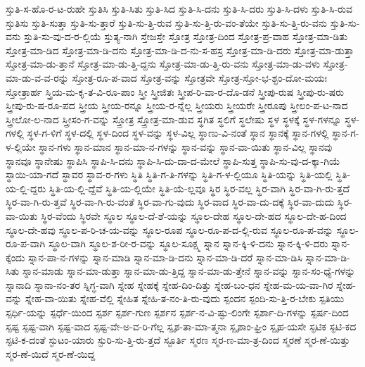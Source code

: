 {ಸ್ತುತಿ-ಸ-ಹೊ-ರ-ಟ-ರುಹೇ
ಸ್ತುತಿಸಿ
ಸ್ತುತಿ-ಸಿತು
ಸ್ತುತಿ-ಸಿದ
ಸ್ತುತಿ-ಸಿ-ದನು
ಸ್ತುತಿ-ಸಿ-ದರು
ಸ್ತುತಿ-ಸಿ-ದಳು
ಸ್ತುತಿ-ಸಿ-ರುವ
ಸ್ತುತಿಸು
ಸ್ತುತಿ-ಸುತ್ತಾ
ಸ್ತುತಿ-ಸು-ತ್ತಾರೆ
ಸ್ತುತಿ-ಸು-ತ್ತಿ-ರುವ
ಸ್ತುತಿ-ಸು-ತ್ತಿ-ರು-ವಂ-ತೆಯೇ
ಸ್ತುತಿ-ಸು-ತ್ತಿ-ರು-ವನು
ಸ್ತುತಿ-ಸು-ವನು
ಸ್ತುತಿ-ಸು-ವು-ದ-ರ-ಲ್ಲಿಯೆ
ಸ್ತುತ್ಯ-ನಾಗಿ
ಸ್ತೇಜಸ್ತೇ
ಸ್ತೋತ್ರ
ಸ್ತೋತ್ರ-ದಿಂದ
ಸ್ತೋತ್ರ-ಪ್ರ-ವಾಹ
ಸ್ತೋತ್ರ-ಮಾ-ಡಿತು
ಸ್ತೋತ್ರ-ಮಾ-ಡಿದ
ಸ್ತೋತ್ರ-ಮಾ-ಡಿ-ದನು
ಸ್ತೋತ್ರ-ಮಾ-ಡಿ-ದ-ನು-ಸ-ಹಸ್ರ
ಸ್ತೋತ್ರ-ಮಾ-ಡಿ-ದರು
ಸ್ತೋತ್ರ-ಮಾ-ಡುತ್ತಾ
ಸ್ತೋತ್ರ-ಮಾ-ಡು-ತ್ತಾನೆ
ಸ್ತೋತ್ರ-ಮಾ-ಡು-ತ್ತಿ-ದ್ದನು
ಸ್ತೋತ್ರ-ಮಾ-ಡು-ತ್ತಿ-ರು-ವನು
ಸ್ತೋತ್ರ-ಮಾ-ಡು-ವಳು
ಸ್ತೋತ್ರ-ಮಾ-ಡು-ವ-ವ-ರನ್ನು
ಸ್ತೋತ್ರ-ರೂ-ಪ-ವಾದ
ಸ್ತೋತ್ರ-ವನ್ನು
ಸ್ತೋತ್ರವೇ
ಸ್ತೋತ್ರ-ಸ್ತೋ-ಭ-ಶ್ಛಂ-ದೋ-ಮಯಃ
ಸ್ತೋತ್ರಾರ್ಹ
ಸ್ತ್ರಿಯ-ಮ-ಕೃ-ತ-ವಿ-ರೂ-ಪಾಂ
ಸ್ತ್ರೀ
ಸ್ತ್ರೀಜಿತಃ
ಸ್ತ್ರೀಪ-ರಿ-ವಾ-ರ-ದೊ-ಡನೆ
ಸ್ತ್ರೀಪು-ರುಷ
ಸ್ತ್ರೀಪು-ರು-ಷರು
ಸ್ತ್ರೀಪು-ರು-ಷ-ರೂ-ಪದ
ಸ್ತ್ರೀಯ
ಸ್ತ್ರೀಯ-ರನ್ನೂ
ಸ್ತ್ರೀಯ-ರ-ನ್ನೆಲ್ಲ
ಸ್ತ್ರೀಯರು
ಸ್ತ್ರೀಯರೇ
ಸ್ತ್ರೀರೂಪು
ಸ್ತ್ರೀಲಂ-ಪ-ಟ-ನಾದ
ಸ್ತ್ರೀಲೋ-ಲ-ನಾದ
ಸ್ತ್ರೀಸಂ-ಗ-ವನ್ನು
ಸ್ತ್ರೋತ್ರ
ಸ್ತ್ರೋತ್ರ-ಮಾ-ಡುವ
ಸ್ಥಗಿತ
ಸ್ಥಲಿಗೆ
ಸ್ಥಲೇಷು
ಸ್ಥಳ
ಸ್ಥಳಕ್ಕೆ
ಸ್ಥಳ-ಗಳನ್ನೂ
ಸ್ಥಳ-ಗಳಲ್ಲಿ
ಸ್ಥಳ-ಗ-ಳಿಗೆ
ಸ್ಥಳ-ದಲ್ಲಿ
ಸ್ಥಳ-ದಿಂದ
ಸ್ಥಳ-ವನ್ನು
ಸ್ಥಳ-ವಿಲ್ಲ
ಸ್ಥಾಣು-ವಿ-ನಂತೆ
ಸ್ಥಾನ
ಸ್ಥಾನಕ್ಕೆ
ಸ್ಥಾನ-ಗಳಲ್ಲಿ
ಸ್ಥಾನ-ಗ-ಳ-ಲ್ಲಿಯೇ
ಸ್ಥಾನ-ಗಳು
ಸ್ಥಾನ-ಮಾನ
ಸ್ಥಾನ-ಮಾ-ನ-ಗಳನ್ನು
ಸ್ಥಾನ-ವನ್ನು
ಸ್ಥಾನ-ವಾ-ಯಿತು
ಸ್ಥಾನ-ವಿಲ್ಲ
ಸ್ಥಾನವು
ಸ್ಥಾನವೂ
ಸ್ಥಾನೇಷು
ಸ್ಥಾಪಿಸಿ
ಸ್ಥಾಪಿ-ಸಿ-ದನು
ಸ್ಥಾಪಿ-ಸಿ-ದು-ದಾ-ದ-ಮೇಲೆ
ಸ್ಥಾಪಿ-ಸುತ್ತ
ಸ್ಥಾಪಿ-ಸು-ವು-ದ-ಕ್ಕಾ-ಗಿಯೆ
ಸ್ಥಾಯಿ-ಯಾ-ಗದೆ
ಸ್ಥಾವರ
ಸ್ಥಾವ-ರ-ಗಳು
ಸ್ಥಿತಿ
ಸ್ಥಿತಿ-ಗ-ತಿ-ಗಳನ್ನು
ಸ್ಥಿತಿ-ಗ-ಳ-ಲ್ಲಿಯೂ
ಸ್ಥಿತಿ-ಯನ್ನು
ಸ್ಥಿತಿ-ಯಲ್ಲಿ
ಸ್ಥಿತಿ-ಯ-ಲ್ಲಿ-ದ್ದರು
ಸ್ಥಿತಿ-ಯ-ಲ್ಲಿ-ದ್ದೆವೆ
ಸ್ಥಿತಿ-ಯ-ಲ್ಲಿಯೇ
ಸ್ಥಿತಿ-ಯೆ-ಲ್ಲವೂ
ಸ್ಥಿರ
ಸ್ಥಿರ-ವಲ್ಲ
ಸ್ಥಿರ-ವಾಗಿ
ಸ್ಥಿರ-ವಾ-ಗಿ-ರು-ತ್ತದೆ
ಸ್ಥಿರ-ವಾ-ಗಿ-ರು-ತ್ತವೆ
ಸ್ಥಿರ-ವಾ-ಗಿ-ರು-ವಂತೆ
ಸ್ಥಿರ-ವಾ-ಗು-ವುದು
ಸ್ಥಿರ-ವಾದ
ಸ್ಥಿರ-ವಾ-ದು-ದಕ್ಕೆ
ಸ್ಥಿರ-ವಾ-ದುದು
ಸ್ಥಿರ-ವಾ-ಯಿತು
ಸ್ಥಿರ-ವೆಂದು
ಸ್ಥಿರವೇ
ಸ್ಥೂಲ
ಸ್ಥೂಲ-ದೆ-ಶೆ-ಯನ್ನು
ಸ್ಥೂಲ-ದೇಹ
ಸ್ಥೂಲ-ದೇ-ಹದ
ಸ್ಥೂಲ-ದೇ-ಹ-ದಿಂದ
ಸ್ಥೂಲ-ದೇ-ಹವು
ಸ್ಥೂಲ-ಪ-ರಿ-ಚ-ಯ-ವನ್ನು
ಸ್ಥೂಲ-ರೂಪ
ಸ್ಥೂಲ-ರೂ-ಪ-ದ-ಲ್ಲಿ-ರುವ
ಸ್ಥೂಲ-ರೂ-ಪ-ವನ್ನು
ಸ್ಥೂಲ-ರೂ-ಪ-ವಾಗಿ
ಸ್ಥೂಲ-ವಾಗಿ
ಸ್ಥೂಲ-ಶ-ರೀ-ರ-ವನ್ನು
ಸ್ಥೂಲ-ಸೂಕ್ಷ್ಮ
ಸ್ನಾನ
ಸ್ನಾನ-ಕ್ಕಿ-ಳಿ-ದನು
ಸ್ನಾನ-ಕ್ಕಿ-ಳಿ-ದರು
ಸ್ನಾನ-ಕ್ಕೆಂದು
ಸ್ನಾನ-ಪಾ-ನ-ಗಳನ್ನು
ಸ್ನಾನ-ಮಾಡಿ
ಸ್ನಾನ-ಮಾ-ಡಿ-ದನು
ಸ್ನಾನ-ಮಾ-ಡಿ-ದರೆ
ಸ್ನಾನ-ಮಾ-ಡಿಸಿ
ಸ್ನಾನ-ಮಾ-ಡಿ-ಸಿತು
ಸ್ನಾನ-ಮಾಡು
ಸ್ನಾನ-ಮಾ-ಡುತ್ತಾ
ಸ್ನಾನ-ಮಾ-ಡು-ತ್ತಿದ್ದ
ಸ್ನಾನ-ಮಾ-ಡು-ತ್ತೇನೆ
ಸ್ನಾನ-ವನ್ನು
ಸ್ನಾನ-ಸಂ-ಧ್ಯೆ-ಗಳನ್ನು
ಸ್ನಾನಾದಿ
ಸ್ನಾನಾ-ನಂ-ತರ
ಸ್ನಿಗ್ಧ-ವಾಗಿ
ಸ್ನೇಹ
ಸ್ನೇಹಕ್ಕೆ
ಸ್ನೇಹ-ದಿಂ-ದಿತ್ತು
ಸ್ನೇಹ-ಬಂ-ಧನ
ಸ್ನೇಹ-ಮ-ಯ-ವಾ-ಗಿರ
ಸ್ನೇಹ-ವನ್ನು
ಸ್ನೇಹ-ವಾ-ಯಿತು
ಸ್ನೇಹ-ವೆಲ್ಲಿ
ಸ್ನೇಹಿತ
ಸ್ನೇಹಿ-ತ-ನಂ-ತಿ-ರು-ವುದು
ಸ್ಪಂದನ
ಸ್ಪಂದಿ-ಸು-ತ್ತಿ-ರ-ಬೇಕು
ಸ್ಪತಿಯು
ಸ್ಪರ್ಧಿ-ಯನ್ನು
ಸ್ಪರ್ಧೆ-ಯಿಂದ
ಸ್ಪರ್ಶ
ಸ್ಪರ್ಶ-ಗುಣ
ಸ್ಪರ್ಶನ
ಸ್ಪರ್ಶ-ನ-ವಿ-ಷ್ಫು-ಲಿಂಗೇ
ಸ್ಪರ್ಶಾ-ದಿ-ಗಳನ್ನು
ಸ್ಪರ್ಷ-ದಿಂದ
ಸ್ಪಷ್ಟ
ಸ್ಪಷ್ಟ-ವಾಗಿ
ಸ್ಪಷ್ಟ-ವಾದ
ಸ್ಪಷ್ಟ-ವೇ-ಅ-ವ-ರಿ-ಗೆಲ್ಲ
ಸ್ಪೃಶ-ತಾ-ಮಾ-ತ್ಮನಾ
ಸ್ಪೃಶಾಂ-ಘ್ರಿಂ
ಸ್ಪೃಹ-ಯಸೇ
ಸ್ಫಟಿಕ
ಸ್ಫಟಿ-ಕದ
ಸ್ಫಟಿ-ಕ-ದಂತೆ
ಸ್ಫುಟಂ-ಯಾರು
ಸ್ಫುರಿ-ಸು-ತ್ತಿ-ರು-ತ್ತದೆ
ಸ್ಫೂರ್ತಿ
ಸ್ಮರಣ
ಸ್ಮರ-ಣ-ಮಾ-ತ್ರ-ದಿಂದ
ಸ್ಮರಣೆ
ಸ್ಮರ-ಣೆ-ಯಿತ್ತು
ಸ್ಮರ-ಣೆ-ಯಿದೆ
ಸ್ಮರ-ಣೆ-ಯಿದ್ದ
}
